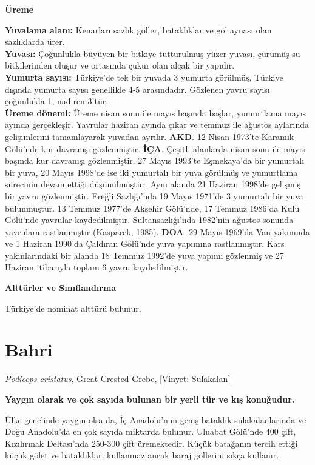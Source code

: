 \documentclass[
  a4paper,
  DIV=11,
  numbers=noendperiod]{scrreprt}
\begin{document}
\textbf{Üreme}

\textbf{Yuvalama alanı:} Kenarları sazlık göller, bataklıklar ve göl
aynası olan sazlıklarda ürer.\\
\textbf{Yuvası:} Çoğunlukla büyüyen bir bitkiye tutturulmuş yüzer
yuvası, çürümüş su bitkilerinden oluşur ve ortasında çukur olan alçak
bir yapıdır.\\
\textbf{Yumurta sayısı:} Türkiye'de tek bir yuvada 3 yumurta görülmüş,
Türkiye dışında yumurta sayısı genellikle 4-5 arasındadır. Gözlenen
yavru sayısı çoğunlukla 1, nadiren 3'tür.\\
\textbf{Üreme dönemi:} Üreme nisan sonu ile mayıs başında başlar,
yumurtlama mayıs ayında gerçekleşir. Yavrular haziran ayında çıkar ve
temmuz ile ağustos aylarında gelişimlerini tamamlayarak yuvadan ayrılır.
\textbf{AKD}. 12 Nisan 1973'te Karamık Gölü'nde kur davranışı
gözlenmiştir. \textbf{İÇA}. Çeşitli alanlarda nisan sonu ile mayıs
başında kur davranışı gözlenmiştir. 27 Mayıs 1993'te Eşmekaya'da bir
yumurtalı bir yuva, 20 Mayıs 1998'de ise iki yumurtalı bir yuva görülmüş
ve yumurtlama sürecinin devam ettiği düşünülmüştür. Aynı alanda 21
Haziran 1998'de gelişmiş bir yavru gözlenmiştir. Ereğli Sazlığı'nda 19
Mayıs 1971'de 3 yumurtalı bir yuva bulunmuştur. 13 Temmuz 1977'de
Akşehir Gölü'nde, 17 Temmuz 1986'da Kulu Gölü'nde yavrular
kaydedilmiştir. Sultansazlığı'nda 1982'nin ağustos sonunda yavrulara
rastlanmıştır (Kasparek, 1985). \textbf{DOA}. 29 Mayıs 1969'da Van
yakınında ve 1 Haziran 1990'da Çaldıran Gölü'nde yuva yapımına
rastlanmıştır. Kars yakınlarındaki bir alanda 18 Temmuz 1992'de yuva
yapımı gözlenmiş ve 27 Haziran itibarıyla toplam 6 yavru kaydedilmiştir.

\textbf{Alttürler ve Sınıflandırma}

Türkiye'de nominat alttürü bulunur.

\section{Bahri}\label{bahri}

\emph{Podiceps cristatus}, Great Crested Grebe, {[}Vinyet: Sulakalan{]}

\textbf{Yaygın olarak ve çok sayıda bulunan bir yerli tür ve kış
konuğudur.}

Ülke genelinde yaygın olsa da, İç Anadolu'nun geniş bataklık
sulakalanlarında ve Doğu Anadolu'da en çok sayıda miktarda bulunur.
Uluabat Gölü'nde 400 çift, Kızılırmak Deltası'nda 250-300 çift
üremektedir. Küçük batağanın tercih ettiği küçük gölet ve bataklıkları
kullanmaz ancak baraj göllerini sıkça kullanır.
\end{document}
